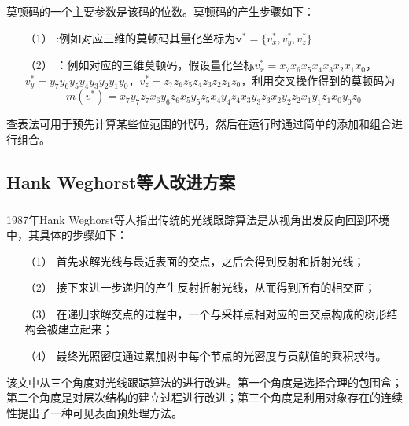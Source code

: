 \documentclass[11pt]{article}
\newcommand{\upcite}[1]{\textsuperscript{\textsuperscript{\cite{#1}}}}
\begin{document}
\par 莫顿码的一个主要参数是该码的位数。莫顿码的产生步骤如下：
\begin{itemize}
\item[（1）]{}:例如对应三维的莫顿码其量化坐标为$\bm{v}^{*}=\{v_x^{*},v_y^{*},v_z^{*}\}$

\item[（2）]{}：例如对应的三维莫顿码，假设量化坐标$v_x^{*}=x_7x_6x_5x_4x_3x_2x_1x_0$，$v_y^{*}=y_7y_6y_5y_4y_3y_2y_1y_0$，$v_z^{*}=z_7z_6z_5z_4z_3z_2z_1z_0$，利用交叉操作得到的莫顿码为
$$
m(v^{*})=x_7y_7z_7x_6y_6z_6x_5y_5z_5x_4y_4z_4x_3y_3z_3x_2y_2z_2x_1y_1z_1x_0y_0z_0
$$
\end{itemize}
查表法可用于预先计算某些位范围的代码，然后在运行时通过简单的添加和组合进行组合。

\subsection{Hank Weghorst等人改进方案}
1987年Hank Weghorst等人\upcite{Hank}指出传统的光线跟踪算法是从视角出发反向回到环境中，其具体的步骤如下：
\begin{itemize}
\item[（1）]{首先求解光线与最近表面的交点，之后会得到反射和折射光线；}
\item[（2）]{接下来进一步递归的产生反射折射光线，从而得到所有的相交面；}
\item[（3）]{在递归求解交点的过程中，一个与采样点相对应的由交点构成的树形结构会被建立起来；}
\item[（4）]{最终光照密度通过累加树中每个节点的光密度与贡献值的乘积求得。}
\end{itemize}

该文中从三个角度对光线跟踪算法的进行改进。第一个角度是选择合理的包围盒；第二个角度是对层次结构的建立过程进行改进；第三个角度是利用对象存在的连续性提出了一种可见表面预处理方法。
\end{document}
